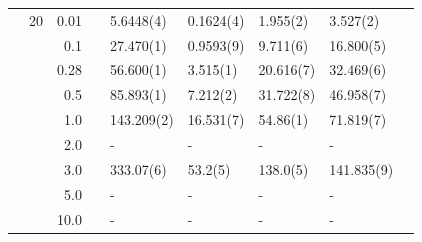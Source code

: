 \begin{table}
\begin{tabularx}{\textwidth}{R{1cm}rrcR{2.3cm}R{2.3cm}R{2.3cm}R{2.3cm}R{1cm}}
		&20 & 0.01 && 5.6448(4) & 0.1624(4) & 1.955(2) & 3.527(2) \\
		&& 0.1 && 27.470(1) & 0.9593(9) & 9.711(6) & 16.800(5) \\
		&& 0.28 && 56.600(1) & 3.515(1) & 20.616(7) & 32.469(6) \\
		&& 0.5 && 85.893(1) & 7.212(2) & 31.722(8) & 46.958(7) \\
		&& 1.0 && 143.209(2) & 16.531(7) & 54.86(1) & 71.819(7) \\
		&& 2.0 && - & - & - & -\\
		&& 3.0 && 333.07(6) & 53.2(5) & 138.0(5) & 141.835(9) \\ 
		&& 5.0 && - & - & - & -\\
		&& 10.0 && - & - & - & -\\
		\hline \hline
	\end{tabularx}
\end{table}